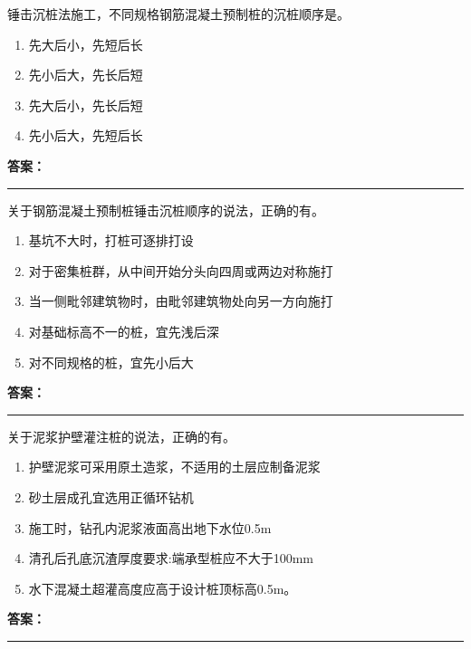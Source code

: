 \documentclass[UTF8,fontset=fandol,11pt]{ctexart}
\newcommand{\answerline}{\textcolor{answerred}{\rule{2.4cm}{0.7pt}}}
\begin{document}
\vspace{0.2em}

\begin{quizbox}[title={第 9 题}]
锤击沉桩法施工，不同规格钢筋混凝土预制桩的沉桩顺序是。\\
\begin{enumerate}[label=\Alph*.]
\item 先大后小，先短后长
\item 先小后大，先长后短
\item 先大后小，先长后短
\item 先小后大，先短后长
\end{enumerate}
\textbf{\textcolor{answerred}{答案：}} \answerline
\end{quizbox}

\vspace{0.2em}

\begin{quizbox}[title={第 10 题}]
关于钢筋混凝土预制桩锤击沉桩顺序的说法，正确的有。\\
\begin{enumerate}[label=\Alph*.]
\item 基坑不大时，打桩可逐排打设
\item 对于密集桩群，从中间开始分头向四周或两边对称施打
\item 当一侧毗邻建筑物时，由毗邻建筑物处向另一方向施打
\item 对基础标高不一的桩，宜先浅后深
\item 对不同规格的桩，宜先小后大
\end{enumerate}
\textbf{\textcolor{answerred}{答案：}} \answerline
\end{quizbox}

\vspace{0.2em}

\begin{quizbox}[title={第 11 题}]
关于泥浆护壁灌注桩的说法，正确的有。\\
\begin{enumerate}[label=\Alph*.]
\item 护壁泥浆可采用原土造浆，不适用的土层应制备泥浆
\item 砂土层成孔宜选用正循环钻机
\item 施工时，钻孔内泥浆液面高出地下水位0.5m
\item 清孔后孔底沉渣厚度要求:端承型桩应不大于100mm
\item 水下混凝土超灌高度应高于设计桩顶标高0.5m。
\end{enumerate}
\textbf{\textcolor{answerred}{答案：}} \answerline
\end{quizbox}
\end{document}
